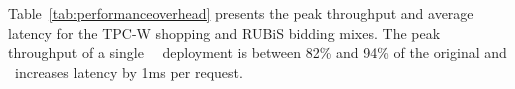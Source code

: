 Table~\ref{tab:performanceoverhead} presents the peak throughput and
average latency for the TPC-W shopping and RUBiS bidding mixes. The peak
throughput of a single \dc\ \gemini\ deployment is between 82\% and 94\%
of the original and \gemini\ increases
latency by 1ms per request.  










